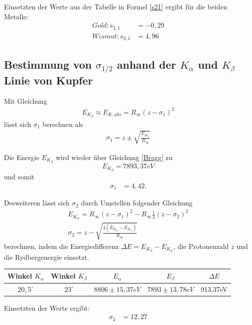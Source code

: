 Einsetzten der Werte aus der Tabelle in Formel \ref{s21} ergibt für die beiden Metalle:
\begin{align*}
Gold: s_{2,1}&=-0,29\\
Wismut: s_{2,1}&=4,96
\end{align*}

\subsection{Bestimmung von $\sigma_{1/2}$ anhand der $K_\alpha$ und $K_\beta$ Linie von Kupfer}
Mit Gleichung
\begin{align}
E_{K_\beta}\approx E_{K,abs} = R_\infty (z- \sigma_1)^2
\end{align}
lässt sich $\sigma_1$ berechnen als
\begin{align}
\sigma_1 = z\pm \sqrt{\frac{E_{K_\beta}}{R_\infty}}			
\end{align}

Die Energie $E_{K_\beta}$ wird wieder über Gleichung \eqref{Bragg} zu
\begin{equation*}
E_{K_\beta}=7893,37eV
\end{equation*}
und somit 
\begin{align*}
\sigma_1 &= 4,42.
\end{align*}

Desweiteren lässt sich $\sigma_2$ durch Umstellen folgender Gleichung
\begin{align}
E_{K_\alpha} = R_\infty (z- \sigma_1)^2 -R_\infty \frac{1}{4}(z- \sigma_2)^2\\
\sigma_2=z-\sqrt{\frac{4(E_{K_\beta}-E_{K_\alpha})}{R_\infty}}
\end{align}
berechnen, indem die Energiedifferenz $\Delta E = E_{K_\beta}-E_{K_\alpha}$, die Protonenzahl $z$ und die Rydbergenergie einsetzt.

\begin{table}[H]
\begin{tabular}{|c|c|c|c|c|}
\hline 
Winkel $K_\alpha$ & Winkel $K_\beta$ & $E_\alpha$ & $E_\beta$ & $\Delta E$ \\ 
\hline 
$20,5^\circ$ & $23^\circ$ & $8806\pm15,37eV$ & $7893\pm13,78eV$ & 913,37eV \\ 
\hline 
\end{tabular} 
\end{table}

Einsetzten der Werte ergibt:
\begin{align*}
\sigma_2 &= 12,27
\end{align*}


